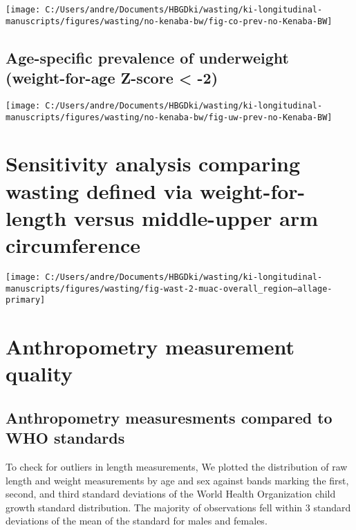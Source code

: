 \documentclass[
  9pt,
]{book}
\begin{document}
\texttt{[image: C:/Users/andre/Documents/HBGDki/wasting/ki-longitudinal-manuscripts/figures/wasting/no-kenaba-bw/fig-co-prev-no-Kenaba-BW]}

\hypertarget{age-specific-prevalence-of-underweight-weight-for-age-z-score--2-1}{%
\section{Age-specific prevalence of underweight (weight-for-age Z-score \textless{} -2)}\label{age-specific-prevalence-of-underweight-weight-for-age-z-score--2-1}}

\texttt{[image: C:/Users/andre/Documents/HBGDki/wasting/ki-longitudinal-manuscripts/figures/wasting/no-kenaba-bw/fig-uw-prev-no-Kenaba-BW]}

\hypertarget{muac}{%
\chapter{Sensitivity analysis comparing wasting defined via weight-for-length versus middle-upper arm circumference}\label{muac}}

\raggedright

\texttt{[image: C:/Users/andre/Documents/HBGDki/wasting/ki-longitudinal-manuscripts/figures/wasting/fig-wast-2-muac-overall\_region--allage-primary]}

\hypertarget{anthro}{%
\chapter{Anthropometry measurement quality}\label{anthro}}

\raggedright

\hypertarget{anthropometry-measuresments-compared-to-who-standards}{%
\section{Anthropometry measuresments compared to WHO standards}\label{anthropometry-measuresments-compared-to-who-standards}}

To check for outliers in length measurements, We plotted the distribution of raw length and weight measurements by age and sex against bands marking the first, second, and third standard deviations of the World Health Organization child growth standard distribution. The majority of observations fell within 3 standard deviations of the mean of the standard for males and females.
\end{document}
